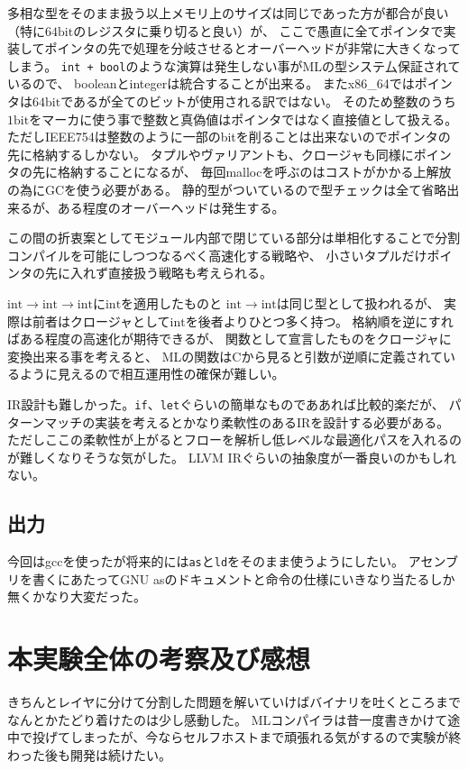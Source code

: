 \documentclass[report]{jlreq}
\begin{document}
      多相な型をそのまま扱う以上メモリ上のサイズは同じであった方が都合が良い（特に$64 \mathrm{bit}$のレジスタに乗り切ると良い）が、
      ここで愚直に全てポインタで実装してポインタの先で処理を分岐させるとオーバーヘッドが非常に大きくなってしまう。
      \texttt{int + bool}のような演算は発生しない事がMLの型システ厶保証されているので、
      booleanとintegerは統合することが出来る。
      またx86\_64ではポインタは$64 \mathrm{bit}$であるが全てのビットが使用される訳ではない。
      そのため整数のうち$1 \mathrm{bit}$をマーカに使う事で整数と真偽値はポインタではなく直接値として扱える。
      ただしIEEE754は整数のように一部のbitを削ることは出来ないのでポインタの先に格納するしかない。
      タプルやヴァリアントも、クロージャも同様にポインタの先に格納することになるが、
      毎回mallocを呼ぶのはコストがかかる上解放の為にGCを使う必要がある。
      静的型がついているので型チェックは全て省略出来るが、ある程度のオーバーヘッドは発生する。

      この間の折衷案としてモジュール内部で閉じている部分は単相化することで分割コンパイルを可能にしつつなるべく高速化する戦略や、
      小さいタプルだけポインタの先に入れず直接扱う戦略も考えられる。

      $\mathrm{int} \rightarrow \mathrm{int} \rightarrow \mathrm{int}$に$\mathrm{int}$を適用したものと
      $\mathrm{int} \rightarrow \mathrm{int}$は同じ型として扱われるが、
      実際は前者はクロージャとして$\mathrm{int}$を後者よりひとつ多く持つ。
      格納順を逆にすればある程度の高速化が期待できるが、
      関数として宣言したものをクロージャに変換出来る事を考えると、
      MLの関数はCから見ると引数が逆順に定義されているように見えるので相互運用性の確保が難しい。

      IR設計も難しかった。\texttt{if}、\texttt{let}ぐらいの簡単なものでああれば比較的楽だが、
      パターンマッチの実装を考えるとかなり柔軟性のあるIRを設計する必要がある。
      ただしここの柔軟性が上がるとフローを解析し低レベルな最適化パスを入れるのが難しくなりそうな気がした。
      LLVM IRぐらいの抽象度が一番良いのかもしれない。

    \section{出力}
      今回はgccを使ったが将来的には\texttt{as}と\texttt{ld}をそのまま使うようにしたい。
      アセンブリを書くにあたってGNU asのドキュメントと命令の仕様にいきなり当たるしか無くかなり大変だった。
  \chapter{本実験全体の考察及び感想}
    きちんとレイヤに分けて分割した問題を解いていけばバイナリを吐くところまでなんとかたどり着けたのは少し感動した。
    MLコンパイラは昔一度書きかけて途中で投げてしまったが、今ならセルフホストまで頑張れる気がするので実験が終わった後も開発は続けたい。
\end{document}
